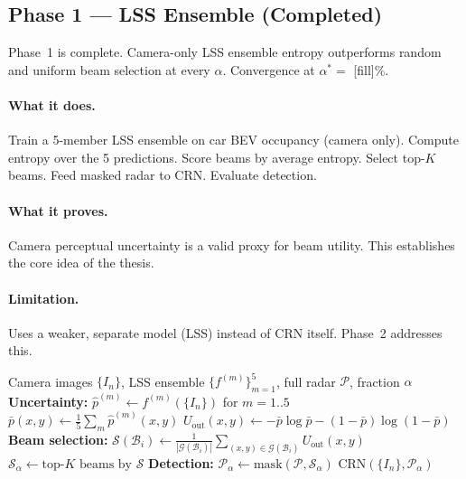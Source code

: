 \documentclass[12pt, a4paper]{article}
\newcommand{\beam}{\mathcal{B}}
\newcommand{\beamset}{\mathcal{S}}
\newcommand{\Uout}{U_{\mathrm{out}}}
\theoremstyle{definition}
\begin{document}
\subsection{Phase 1 --- LSS Ensemble (Completed)}
\label{sec:phase1}

\begin{donebox}
  Phase~1 is complete. Camera-only LSS ensemble entropy outperforms random and
  uniform beam selection at every $\alpha$. Convergence at $\alpha^* =$ [fill]\%.
\end{donebox}

\paragraph{What it does.} Train a 5-member LSS ensemble on car BEV occupancy
(camera only). Compute entropy over the 5 predictions. Score beams by average
entropy. Select top-$K$ beams. Feed masked radar to CRN. Evaluate detection.

\paragraph{What it proves.} Camera perceptual uncertainty is a valid proxy for
beam utility. This establishes the core idea of the thesis.

\paragraph{Limitation.} Uses a weaker, separate model (LSS) instead of CRN itself.
Phase~2 addresses this.

\begin{algorithm}[H]
\caption{Phase~1: LSS Ensemble Beam Selection}
\label{alg:phase1}
\begin{algorithmic}[1]
\Require Camera images $\{I_n\}$, LSS ensemble $\{f^{(m)}\}_{m=1}^5$,
         full radar $\mathcal{P}$, fraction $\alpha$
\State \textbf{Uncertainty:} $\hat{p}^{(m)}\gets f^{(m)}(\{I_n\})$ for $m=1..5$
\State $\bar{p}(x,y)\gets\frac{1}{5}\sum_m\hat{p}^{(m)}(x,y)$
\State $\Uout(x,y)\gets-\bar{p}\log\bar{p}-(1-\bar{p})\log(1-\bar{p})$
\State \textbf{Beam selection:} $\mathcal{S}(\beam_i)\gets
       \frac{1}{|\mathcal{G}(\beam_i)|}\sum_{(x,y)\in\mathcal{G}(\beam_i)}\Uout(x,y)$
\State $\beamset_\alpha\gets\text{top-}K\text{ beams by }\mathcal{S}$
\State \textbf{Detection:} $\mathcal{P}_\alpha\gets\text{mask}(\mathcal{P},\beamset_\alpha)$
\State \Return $\mathrm{CRN}(\{I_n\},\mathcal{P}_\alpha)$
\end{algorithmic}
\end{algorithm}
\end{document}
